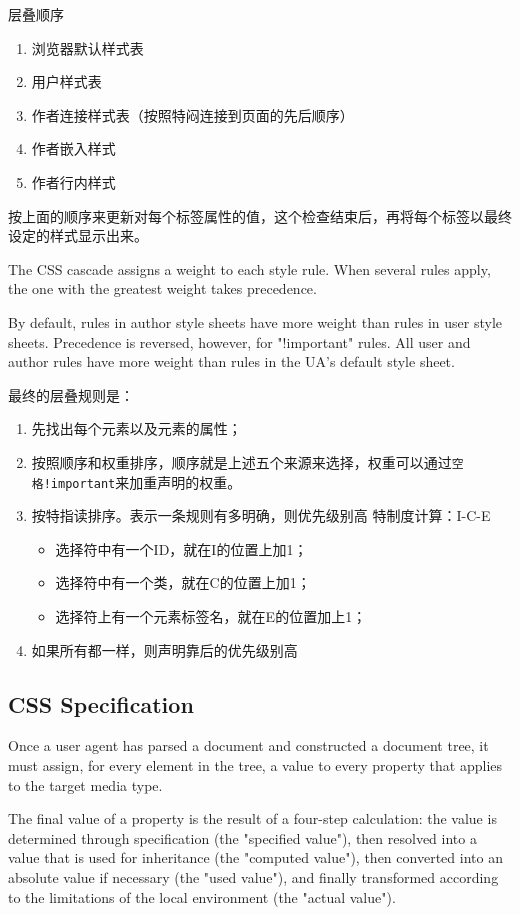 层叠顺序
\begin{enumerate}
\item 浏览器默认样式表
\item 用户样式表
\item 作者连接样式表（按照特闷连接到页面的先后顺序）
\item 作者嵌入样式
\item 作者行内样式
\end{enumerate}

按上面的顺序来更新对每个标签属性的值，这个检查结束后，再将每个标签以最终设定的样式显示出来。

The CSS cascade assigns a weight to each style rule. When several rules apply, the one with the greatest weight takes precedence. 

By default, rules in author style sheets have more weight than rules in user style sheets. Precedence is reversed, however, for "!important" rules. All user and author rules have more weight than rules in the UA's default style sheet. 


最终的层叠规则是：
\begin{enumerate}
\item 先找出每个元素以及元素的属性；
\item 按照顺序和权重排序，顺序就是上述五个来源来选择，权重可以通过\lstinline$空格!important$来加重声明的权重。
\item 按特指读排序。表示一条规则有多明确，则优先级别高
特制度计算：I-C-E
\begin{itemize}
\item 选择符中有一个ID，就在I的位置上加1；
\item 选择符中有一个类，就在C的位置上加1；
\item 选择符上有一个元素标签名，就在E的位置加上1；
\end{itemize}
\item 如果所有都一样，则声明靠后的优先级别高
\end{enumerate}




\subsection{CSS Specification}

Once a user agent has parsed a document and constructed a document tree, it must assign, for every element in the tree, a value to every property that applies to the target media type.

The final value of a property is the result of a four-step calculation: the value is determined through specification (the "specified value"), then resolved into a value that is used for inheritance (the "computed value"), then converted into an absolute value if necessary (the "used value"), and finally transformed according to the limitations of the local environment (the "actual value").

